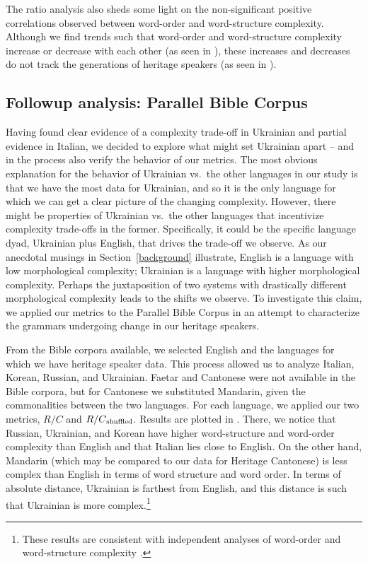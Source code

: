 \documentclass[output=paper]{langscibook}
\begin{document}
The ratio analysis also sheds some light on the non-significant positive correlations observed between word-order and word-structure complexity. Although we find trends such that word-order and word-structure complexity increase or decrease with each other (as seen in ), these increases and decreases do not track the generations of heritage speakers (as seen in ).


\subsection{Followup analysis: Parallel Bible Corpus}

Having found clear evidence of a complexity trade-off in Ukrainian and partial evidence in Italian, we decided to explore what might set Ukrainian apart -- and in the process also verify the behavior of our metrics. The most obvious explanation for the behavior of Ukrainian vs.~the other languages in our study is that we have the most data for Ukrainian, and so it is the only language for which we can get a clear picture of the changing complexity. However, there might be properties of Ukrainian vs.~the other languages that incentivize complexity trade-offs in the former. Specifically, it could be the specific language dyad, Ukrainian plus English, that drives the trade-off we observe. As our anecdotal musings in Section~\ref{background} illustrate, English is a language with low morphological complexity; Ukrainian is a language with higher morphological complexity. Perhaps the juxtaposition of two systems with drastically different morphological complexity leads to the shifts we observe. To investigate this claim, we applied our metrics to the Parallel Bible Corpus \citep{mayer2014creating} in an attempt to characterize the grammars undergoing change in our heritage speakers.

From the Bible corpora available, we selected English and the languages for which we have heritage speaker data. This process allowed us to analyze Italian, Korean, Russian, and Ukrainian. Faetar and Cantonese were not available in the Bible corpora, but for Cantonese we substituted Mandarin, given the commonalities between the two languages. For each language, we applied our two metrics, $R/C$ and $R/C\textsubscript{shuffled}$. Results are plotted in . There, we notice that Russian, Ukrainian, and Korean have higher word-structure and word-order complexity than English and that Italian lies close to English. On the other hand, Mandarin (which may be compared to our data for Heritage Cantonese) is less complex than English in terms of word structure and word order. In terms of absolute distance, Ukrainian is farthest from English, and this distance is such that Ukrainian is more complex.\footnote{These results are consistent with independent analyses of word-order and word-structure complexity \citep[e.g.,][]{bakker1998,sadeniemi2008complexity}.}\largerpage
\end{document}

